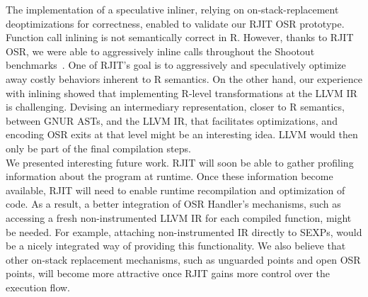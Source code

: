 The implementation of a speculative inliner, relying on on-stack-replacement deoptimizations for correctness, enabled to validate our RJIT OSR prototype. 
Function call inlining is not semantically correct in R.
However, thanks to RJIT OSR, we were able to aggressively inline calls throughout the Shootout benchmarks~\cite{Shootout}.
One of RJIT's goal is to aggressively and speculatively optimize away costly behaviors inherent to R semantics.
On the other hand, our experience with inlining showed that implementing R-level transformations at the LLVM IR is challenging.
Devising an intermediary representation, closer to R semantics, between GNUR ASTs, and the LLVM IR, that facilitates optimizations, and encoding OSR exits at that level might be an interesting idea.
LLVM would then only be part of the final compilation steps.\\

We presented interesting future work.
RJIT will soon be able to gather profiling information about the program at runtime. 
Once these information become available, RJIT will need to enable runtime recompilation and optimization of code.
As a result, a better integration of OSR Handler's mechanisms, such as accessing a fresh non-instrumented LLVM IR for each compiled function, might be needed. 
For example, attaching non-instrumented IR directly to SEXPs, would be a nicely integrated way of providing this functionality.
We also believe that other on-stack replacement mechanisms, such as unguarded points and open OSR points, will become more attractive once RJIT gains more control over the execution flow.\\